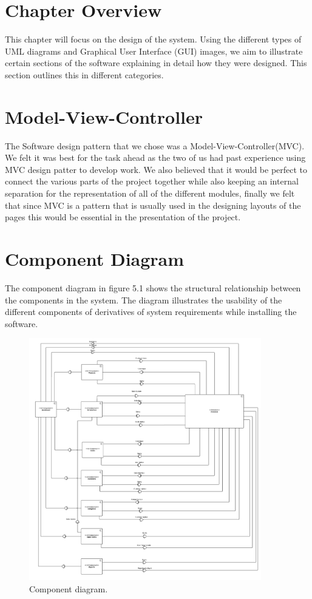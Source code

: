 
\section{Chapter Overview}

This chapter will focus on the design of the system. Using the different types of UML diagrams and Graphical User Interface (GUI) images, we aim to illustrate certain sections of the software explaining in detail how they were designed. This section outlines this in different categories. 
\section{Model-View-Controller}
The Software design pattern that we chose was a Model-View-Controller(MVC). We felt it was best for the task ahead as the two of us had past experience using MVC design patter to develop work. We also believed that it would be perfect to connect the various parts of the project together while also keeping an internal separation for the representation of all of the different modules, finally we felt that since MVC is a pattern that is usually used in the designing layouts of the pages this would be essential in the presentation of the project.

\section{Component Diagram}

The component diagram in figure 5.1 shows the structural relationship between the components in the system. The diagram illustrates the usability of the different components of derivatives of system requirements while installing the software.
\begin{figure}[h!]
	\caption{Component diagram.}
	\label{image:myImageName}
	\centering
	\includegraphics[width=0.9\textwidth]{Fig images/POS Component.png}
\end{figure}
